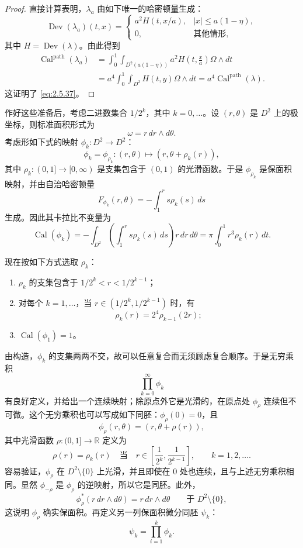\begin{proof}
直接计算表明，$\lambda_a$ 由如下唯一的哈密顿量生成：
\[
 \operatorname{Dev}(\lambda_a)(t,x)=
 \begin{cases}
  a^2H(t,x/a),&|x|\le a(1-\eta),\\
  0,&\text{其他情形},
 \end{cases}
\]
其中 $H=\operatorname{Dev}(\lambda)$。由此得到
\[
\begin{aligned}
 \operatorname{Cal}^{\mathrm{path}}(\lambda_a)
 &=\int_0^1\int_{D^2(a(1-\eta))}
   a^2H\left(t,\frac xa\right)\Omega\wedge dt\\
 &=a^4\int_0^1\int_{D^2}H(t,y)\Omega\wedge dt
  =a^4\operatorname{Cal}^{\mathrm{path}}(\lambda).
\end{aligned}
\]
这证明了 \eqref{eq:2.5.37}。
\end{proof}

作好这些准备后，考虑二进数集合 $1/2^k$，其中 $k=0,\ldots$。设 $(r,\theta)$ 是 $D^2$ 上的极坐标，则标准面积形式为
\[
  \omega=r\,dr\wedge d\theta.
\]
考虑形如下式的映射 $\phi_k:D^2\to D^2$：
\[
  \phi_k=\phi_{\rho_k}:(r,\theta)
  \longmapsto(r,\theta+\rho_k(r)),
\]
其中 $\rho_k:(0,1]\to[0,\infty)$ 是支集包含于 $(0,1)$ 的光滑函数。于是 $\phi_{\rho_k}$ 是保面积映射，并由自治哈密顿量
\[
  F_{\phi_k}(r,\theta)=-\int_1^r s\rho_k(s)\,ds
\]
生成。因此其卡拉比不变量为
\begin{equation}
 \operatorname{Cal}(\phi_k)
 =-\int_{D^2}\left(\int_1^r s\rho_k(s)\,ds\right)r\,dr\,d\theta
 =\pi\int_0^1r^3\rho_k(r)\,dt.
 \label{eq:2.5.38}
\end{equation}

现在按如下方式选取 $\rho_k$：
\begin{enumerate}[label=(\arabic*)]
  \item $\rho_k$ 的支集包含于 $1/2^k<r<1/2^{k-1}$；
  \item 对每个 $k=1,\ldots$，当 $r\in(1/2^k,1/2^{k-1})$ 时，有
  \begin{equation}
    \rho_k(r)=2^4\rho_{k-1}(2r);
    \label{eq:2.5.39}
  \end{equation}
  \item $\operatorname{Cal}(\phi_1)=1$。
\end{enumerate}
由构造，$\phi_k$ 的支集两两不交，故可以任意复合而无须顾虑复合顺序。于是无穷乘积
\[
  \prod_{k=0}^\infty\phi_k
\]
有良好定义，并给出一个连续映射；除原点外它是光滑的，在原点处 $\phi_\rho$ 连续但不可微。这个无穷乘积也可以写成如下同胚：$\phi_\rho(0)=0$，且
\[
  \phi_\rho(r,\theta)=(r,\theta+\rho(r)),
\]
其中光滑函数 $\rho:(0,1]\to\mathbb R$ 定义为
\[
  \rho(r)=\rho_k(r)
  \quad\text{当}\quad
  r\in\left[\frac1{2^k},\frac1{2^{k-1}}\right],
  \qquad k=1,2,\ldots.
\]
容易验证，$\phi_\rho$ 在 $D^2\setminus\{0\}$ 上光滑，并且即使在 $0$ 处也连续，且与上述无穷乘积相同。显然 $\phi_{-\rho}$ 是 $\phi_\rho$ 的逆映射，所以它是同胚。此外，
\[
  \phi_\rho^*(r\,dr\wedge d\theta)
  =r\,dr\wedge d\theta
  \qquad\text{于 }D^2\setminus\{0\},
\]
这说明 $\phi_\rho$ 确实保面积。再定义另一列保面积微分同胚 $\psi_k$：
\[
  \psi_k=\prod_{i=1}^k\phi_k.
\]

